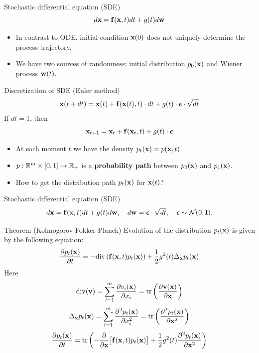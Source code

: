 \begin{frame}{Stochastic differential equation (SDE)}
	\[
		d\mathbf{x} = \mathbf{f}(\mathbf{x}, t) dt + g(t) d \mathbf{w}
	\]
	\vspace{-0.3cm}
	\begin{itemize}
		\item In contrast to ODE, initial condition $\mathbf{x}(0)$ does not uniquely determine the process trajectory.
		\item We have two sources of randomness: initial distribution $p_0(\mathbf{x})$ and Wiener process $\mathbf{w}(t)$.
	\end{itemize}
	\begin{block}{Discretization of SDE (Euler method)}
		\vspace{-0.3cm}
		\[
			\mathbf{x}(t + dt) = \mathbf{x}(t) + \mathbf{f}(\mathbf{x}(t), t) \cdot dt + g(t) \cdot \boldsymbol{\epsilon} \cdot \sqrt{dt}
		\]
		If $dt = 1$, then
		\vspace{-0.3cm}
		\[
			\mathbf{x}_{t + 1} = \mathbf{x}_t + \mathbf{f}(\mathbf{x}_t, t) + g(t) \cdot \boldsymbol{\epsilon}
		\]
		\vspace{-0.7cm}
	\end{block}
	\begin{itemize}
		\item At each moment $t$ we have the density $p_t(\mathbf{x}) = p(\mathbf{x}, t)$.
		\item $p: \mathbb{R}^m \times [0, 1] \rightarrow \mathbb{R}_+$ is a \textbf{probability path} between $p_0(\mathbf{x})$ and $p_1(\mathbf{x})$.
		\item How to get the distribution path $p_t(\mathbf{x})$ for $\mathbf{x}(t)$?
	\end{itemize}
\end{frame}
\begin{frame}{Stochastic differential equation (SDE)}
	\vspace{-0.4cm}
	\[
		d\mathbf{x} = \mathbf{f}(\mathbf{x}, t) dt + g(t) d \mathbf{w}, \quad d \mathbf{w} = \boldsymbol{\epsilon} \cdot \sqrt{dt}, \quad \boldsymbol{\epsilon} \sim \mathcal{N}(0, \mathbf{I}).
	\]
	\vspace{-0.4cm}
 	\begin{block}{Theorem (Kolmogorov-Fokker-Planck)}
 		Evolution of the distribution $p_t(\mathbf{x})$ is given by the following equation:
 		\vspace{-0.2cm}
 		\[
 			\frac{\partial p_t(\mathbf{x})}{\partial t} = - \text{div}\left(\mathbf{f}(\mathbf{x}, t) p_t(\mathbf{x})\right) + \frac{1}{2}g^2(t) \Delta_{\mathbf{x}}p_t(\mathbf{x})
 		\]
 		Here
 		\[
 			\text{div} (\mathbf{v}) = \sum_{i=1}^m \frac{\partial v_i(\mathbf{x})}{\partial x_i} = \text{tr}\left( \frac{\partial \mathbf{v}(\mathbf{x})}{\partial \mathbf{x}}  \right)
 		\]
 		\[
 			\Delta_{\mathbf{x}}p_t(\mathbf{x}) = \sum_{i=1}^m \frac{\partial^2 p_t(\mathbf{x})}{\partial x_i^2} = \text{tr}\left( \frac{\partial^2 p_t(\mathbf{x})}{\partial \mathbf{x}^2}  \right)
 		\]
 		\[
 			\frac{\partial p_t(\mathbf{x})}{\partial t} = \text{tr}\left(- \frac{\partial}{\partial \mathbf{x}} \bigl[ \mathbf{f}(\mathbf{x}, t) p_t(\mathbf{x})\bigr] + \frac{1}{2} g^2(t) \frac{\partial^2 p_t(\mathbf{x})}{\partial \mathbf{x}^2} \right)
 		\]
 	\end{block}
\end{frame}
